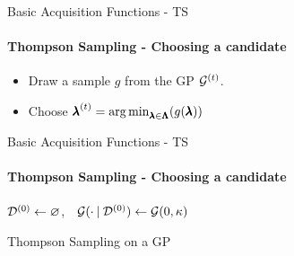 \begin{frame}[c]{Basic Acquisition Functions - TS}
\framesubtitle{Thompson Sampling - Choosing a candidate}
\pause
\begin{itemize}
    \item Draw a sample $g$ from the GP $\iter{\gp}$.
    \pause
    \item Choose $\bonextsample=\argmin_{\conf\in\pcs}(g(\conf))$
\end{itemize}
\end{frame}
\begin{frame}[c]{Basic Acquisition Functions - TS}
\framesubtitle{Thompson Sampling - Choosing a candidate}
\begin{center}
\begin{minipage}{0.75\textwidth}
\begin{algorithm}[H]
    \LinesNumbered
    \SetAlgoLined
    \setcounter{AlgoLine}{0}
    
    
    $\iter[0]{\dataset}\leftarrow\varnothing$,$\quad\gp(\cdot \given \iter[0]{\dataset})\leftarrow\gp(0, \kernel)$\;
    
    \caption{Thompson Sampling on a GP}
\end{algorithm}
\end{minipage}
\end{center}
\end{frame}
